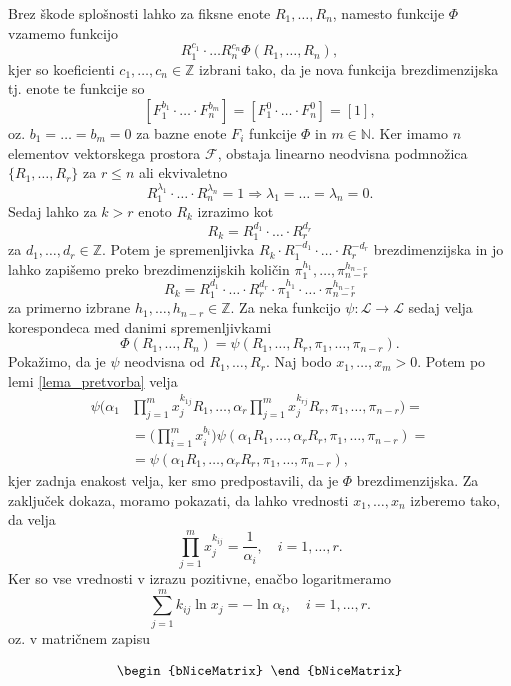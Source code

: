 \documentclass[mat2, tisk]{fmfdelo}
\newcommand{\N}{\mathbb N}
\newcommand{\Z}{\mathbb Z}
\begin{document}
\begin{dokaz}
Brez škode splošnosti lahko za fiksne enote $R_1, \dots, R_n$, namesto funkcije $\Phi$ vzamemo funkcijo 
$$
R_1^{c_1} \cdot \ldots R_n^{c_n} \Phi(R_1, \dots, R_n),
$$
kjer so koeficienti $c_1, \dots, c_n \in \Z$ izbrani tako, da je 
nova funkcija brezdimenzijska tj. enote te funkcije so 
$$
[F_1^{b_1} \cdot \ldots \cdot F_n^{b_m}] = [F_1^0 \cdot \ldots \cdot F_n^{0}] = [1],
$$
oz. $b_1 = \dots = b_m = 0$ za bazne enote $F_i$ funkcije $\Phi$ in $m\in \N$.
Ker imamo $n$ elementov vektorskega prostora $\mathcal{F}$, obstaja 
linearno neodvisna podmnožica $\{R_1, \dots, R_r\}$ za $r \leq n$ ali 
ekvivaletno 
$$
R_1^{\lambda_1} \cdot \ldots \cdot R_n^{\lambda_n} = 1 \Longrightarrow \lambda_1 = \dots = \lambda_n = 0.
$$
Sedaj lahko za $k > r$ enoto $R_k$ izrazimo kot 
$$
R_k = R_1^{d_1}\cdot \ldots \cdot R_r^{d_r}
$$
za $d_1, \dots, d_r \in \Z$. Potem je spremenljivka 
$R_k \cdot R_1^{-d_1}\cdot \ldots \cdot R_r^{-d_r}$ brezdimenzijska 
in jo lahko zapišemo preko brezdimenzijskih količin $\pi_1^{h_1}, \dots, \pi_{n-r}^{h_{n-r}}$
$$
R_k = R_1^{d_1}\cdot \ldots \cdot R_r^{d_r} \cdot \pi_1^{h_1} \cdot \ldots \cdot \pi_{n-r}^{h_{n-r}}
$$
za primerno izbrane $h_1, \dots, h_{n-r} \in \Z$. Za neka funkcijo
$\psi: \mathcal{L} \rightarrow \mathcal{L}$ sedaj velja korespondeca med 
danimi spremenljivkami 
$$
\Phi(R_1, \dots, R_n) = \psi(R_1, \dots, R_r, \pi_1, \dots, \pi_{n-r}).
$$
Pokažimo, da je $\psi$ neodvisna od $R_1, \dots, R_r$. Naj bodo 
$x_1, \dots, x_m > 0$. Potem po lemi \ref{lema_pretvorba} velja 
\begin{align*}
\psi\Big(\alpha_1 &\prod_{j=1}^m x_j^{k_{1j}} R_1, \dots, \alpha_r \prod_{j=1}^m x_j^{k_{rj}} R_r, \pi_1, \dots, \pi_{n-r}\Big) = \\
&= \Big(\prod_{i=1}^m x_i^{b_i}\Big) \psi(\alpha_1 R_1, \dots, \alpha_r R_r, \pi_1, \dots, \pi_{n-r}) = \\
&= \psi(\alpha_1 R_1, \dots, \alpha_r R_r, \pi_1, \dots, \pi_{n-r}),
\end{align*}
kjer zadnja enakost velja, ker smo predpostavili, da je $\Phi$ brezdimenzijska.
Za zaključek dokaza, moramo pokazati, da lahko vrednosti $x_1, \dots, x_n$
izberemo tako, da velja 
$$
\prod_{j=1}^m x_j^{k_{ij}} = \frac{1}{\alpha_i}, \quad i = 1, \dots, r.
$$
Ker so vse vrednosti v izrazu pozitivne, enačbo logaritmeramo 
$$
\sum_{j=1}^m k_{ij} \ln{x_j} = - \ln{\alpha_i},  \quad i = 1, \dots, r.
$$
oz. v matričnem zapisu 
\begin{NiceMatrixBlock}
\[
\begin{bNiceMatrix}

\end{bNiceMatrix}\]
\end{NiceMatrixBlock}
\end{dokaz}
\end{document}
